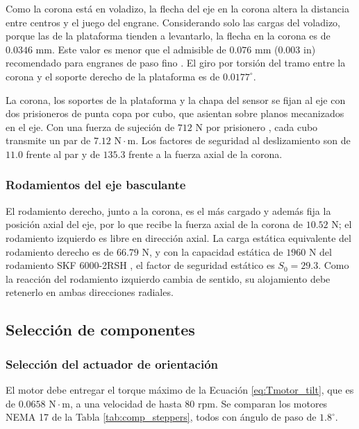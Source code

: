 \documentclass[../../General.tex]{subfiles}
\begin{document}
Como la corona está en voladizo, la flecha del eje en la corona altera la distancia entre centros y el juego del engrane. Considerando solo las cargas del voladizo, porque las de la plataforma tienden a levantarlo, la flecha en la corona es de $0.0346\text{ mm}$. Este valor es menor que el admisible de $0.076\text{ mm}$ ($0.003\text{ in}$) recomendado para engranes de paso fino \citep{shigley2012mecanico}. El giro por torsión del tramo entre la corona y el soporte derecho de la plataforma es de $0.0177^\circ$.

La corona, los soportes de la plataforma y la chapa del sensor se fijan al eje con dos prisioneros de punta copa por cubo, que asientan sobre planos mecanizados en el eje. Con una fuerza de sujeción de $712\text{ N}$ por prisionero \citep{shigley2012mecanico}, cada cubo transmite un par de $7.12\text{ N}\cdot\text{m}$. Los factores de seguridad al deslizamiento son de $11.0$ frente al par y de $135.3$ frente a la fuerza axial de la corona.


\subsubsection{Rodamientos del eje basculante}

El rodamiento derecho, junto a la corona, es el más cargado y además fija la posición axial del eje, por lo que recibe la fuerza axial de la corona de $10.52\text{ N}$; el rodamiento izquierdo es libre en dirección axial. La carga estática equivalente del rodamiento derecho es de $66.79\text{ N}$, y con la capacidad estática de $1960\text{ N}$ del rodamiento SKF 6000-2RSH \citep{skf2020bearings}, el factor de seguridad estático es $S_0 = 29.3$. Como la reacción del rodamiento izquierdo cambia de sentido, su alojamiento debe retenerlo en ambas direcciones radiales.

\subsection{Selección de componentes}

\subsubsection{Selección del actuador de orientación}

El motor debe entregar el torque máximo de la Ecuación \ref{eq:Tmotor_tilt}, que es de $0.0658\text{ N}\cdot\text{m}$, a una velocidad de hasta $80\text{ rpm}$. Se comparan los motores NEMA 17 de la Tabla \ref{tab:comp_steppers}, todos con ángulo de paso de $1.8^\circ$.
\end{document}
